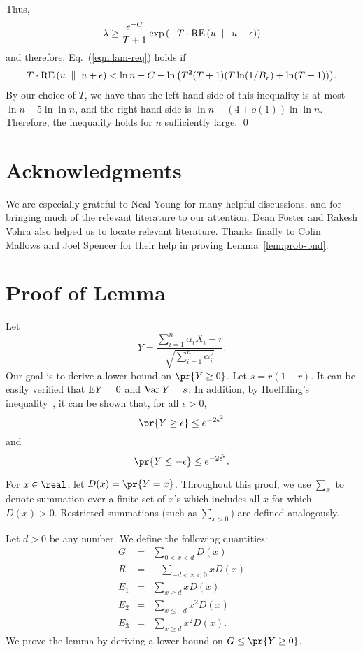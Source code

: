 Thus,
\[\lambda \geq \frac{e^{-C}}{T+1} \exp{\left({-T\cdot {\rm RE}\left( {u} \; \parallel \; {u+\epsilon} \right) }\right)}\]
and therefore, Eq.~(\ref{eqn:lam-req}) holds if
\[
T\cdot {\rm RE}\left( {u} \; \parallel \; {u+\epsilon} \right)
  < \ln n - C - \ln{\left({T^2(T+1)(T\ln(1/B_r)+\ln(T+1))}\right)}.
\]
By our choice of $T$, we have that the left hand side of this
inequality is at most $\ln n - 5\ln\ln n$, and the right hand side is
$\ln n - (4+o(1))\ln\ln n$.
Therefore, the inequality holds for $n$ sufficiently large.
\qed

\section*{Acknowledgments}

We are especially grateful to Neal Young for many helpful discussions,
and for bringing much of the relevant literature to our attention.
Dean Foster and Rakesh Vohra also helped us to locate relevant literature.
Thanks finally to Colin Mallows and Joel Spencer for their help in
proving Lemma~\ref{lem:prob-bnd}.




\appendix

\section{Proof of Lemma~\protect{\ref{lem:prob-bnd}}}

Let
\[
Y = \frac{\sum_{i=1}^n \alpha_i X_i - r} {\sqrt{\sum_{i=1}^n \alpha_i^2}}.
\]
Our goal is to derive a lower bound on $\pr{Y\geq 0}$.
Let $s=r(1-r)$.
It can be easily verified that ${\rm E}Y=0$ and ${\rm Var}\;Y=s$.
In addition, by Hoeffding's inequality~\cite{Hoeffding63}, it
can be shown that, for all $\epsilon > 0$,
\begin{equation} \label{eqn:tail-bnd}
\pr{Y\geq \epsilon} \leq e^{-2\epsilon^2}
\end{equation}
and
\[\pr{Y\leq -\epsilon} \leq e^{-2\epsilon^2}.\]

For $x\in \real$, let $D(x) = \pr{Y=x}$.
Throughout this proof, we use $\sum_x$ to denote summation over a
finite set of $x$'s which includes all $x$ for which $D(x)>0$.
Restricted summations (such as $\sum_{x>0}$) are defined analogously.

Let $d>0$ be any number.
We define the following quantities:
\begin{eqnarray*}
G &=& \sum_{0 < x < d} D(x)\\
R &=& -\sum_{-d < x < 0} x D(x)\\
E_1 &=& \sum_{x \geq d} x D(x)\\
E_2 &=& \sum_{x \leq -d} x^2 D(x)\\
E_3 &=& \sum_{x \geq d} x^2 D(x).
\end{eqnarray*}
We prove the lemma by deriving a lower bound on $G\leq \pr{Y\geq 0}$.

